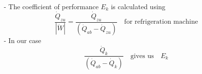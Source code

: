 - The coefficient of performance \( E_k \) is calculated using 
  \[
  \frac{\dot{Q}_{zu}}{|\dot{W}|} = \frac{\dot{Q}_{zu}}{(\dot{Q}_{ab} - \dot{Q}_{zu})} \quad \text{for refrigeration machine}
  \]
- In our case 
  \[
  \frac{\dot{Q}_k}{(\dot{Q}_{ab} - \dot{Q}_k)} \quad \text{gives us} \quad E_k
  \]